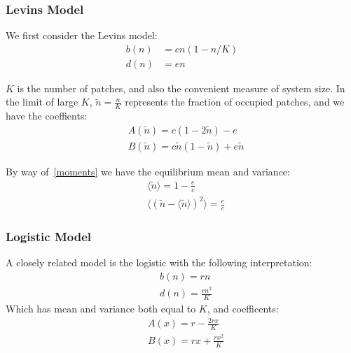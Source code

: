 \documentclass[letterpaper,10pt]{article}
\begin{document}
\subsubsection*{Levins Model}
We first consider the Levins model:
\begin{align}
b(n) &= c n \left( 1 - n/K \right) \nonumber \\
d(n) &= e n
\label{levins}
\end{align}

$K$ is the number of patches, and also the convenient measure of system size.  In the limit of large $K$, $\tilde n = \tfrac{n}{K}$ represents the fraction of occupied patches, and we have the coeffients:
\begin{align*}
& A(\tilde n) = c(1-2 \tilde n)-e \\
& B(\tilde n) = c \tilde n (1 - \tilde n) + e \tilde n
\end{align*}

By way of~\eqref{moments} we have the equilibrium mean and variance:
\begin{align*}
& \langle \tilde n \rangle = 1-\frac{e}{c} \\
& \langle (\tilde n - \langle \tilde n \rangle )^2 \rangle = \frac{e}{c}
\end{align*}

\subsubsection*{Logistic Model}
A closely related model is the logistic with the following interpretation:
\begin{align*}
& b(n) = r n \\
& d(n) = \frac{r n^2}{K}
\end{align*}
Which has mean and variance both equal to $K$, and coefficents:
\begin{align*}
& A(x) = r  - \frac{2 r x}{K} \\
& B(x) = rx + \frac{rx^2}{K}
\end{align*}
\end{document}

